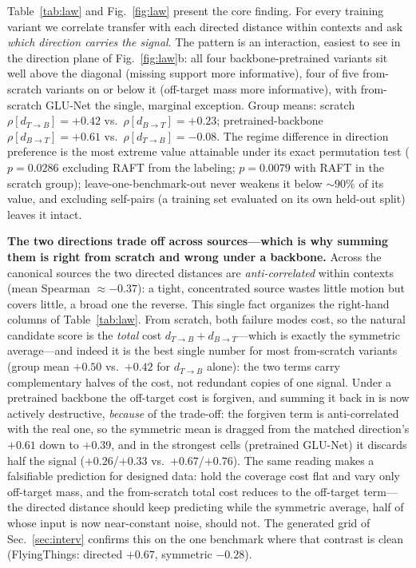 \documentclass[runningheads]{llncs}
\newcommand{\dtb}{d_{T\to B}}
\newcommand{\dbt}{d_{B\to T}}
\begin{document}
\begin{table}[t]
\centering
\caption{\textbf{The identical analysis in appearance (DINO) space} (the
negative control for Table~\ref{tab:law}): no direction and no symmetric
distance carries usable signal for any variant, and no regime structure
exists. Whatever drives Table~\ref{tab:law} lives in motion, not in what the
frames look like.}
\label{tab:lawdino}
\footnotesize

\end{table}

Table~\ref{tab:law} and Fig.~\ref{fig:law} present the core finding. For
every training variant we correlate transfer with each directed distance
within contexts and ask \emph{which direction carries the signal}. The
pattern is an interaction, easiest to see in the direction plane of
Fig.~\ref{fig:law}b: all four backbone-pretrained variants sit well above
the diagonal (missing support more informative), four of five from-scratch
variants on or below it (off-target mass more informative), with from-scratch
GLU-Net the single, marginal exception. Group means: scratch
$\rho[\dtb]{=}{+}0.42$ vs.\ $\rho[\dbt]{=}{+}0.23$; pretrained-backbone
$\rho[\dbt]{=}{+}0.61$ vs.\ $\rho[\dtb]{=}{-}0.08$. The regime difference in
direction preference is the most extreme value attainable under its exact
permutation test ($p{=}0.0286$ excluding RAFT from the labeling; $p{=}0.0079$
with RAFT in the scratch group); leave-one-benchmark-out never weakens it
below ${\sim}90\%$ of its value, and excluding self-pairs (a training set evaluated
on its own held-out split) leaves it intact.

\noindent\textbf{The two directions trade off across sources---which is why
summing them is right from scratch and wrong under a backbone.}
Across the canonical sources the two directed distances are
\emph{anti-correlated} within contexts (mean Spearman $\approx{-}0.37$): a
tight, concentrated source wastes little motion but covers little, a broad
one the reverse. This single fact organizes the right-hand columns of
Table~\ref{tab:law}. From scratch, both failure modes cost, so the natural
candidate score is the \emph{total} cost $\dtb{+}\dbt$---which is exactly the
symmetric average---and indeed it is the best single number for most
from-scratch variants (group mean $+0.50$ vs.\ $+0.42$ for $\dtb$ alone):
the two terms carry complementary halves of the cost, not redundant copies
of one signal. Under a pretrained backbone the off-target cost is forgiven,
and summing it back in is now actively destructive, \emph{because} of the
trade-off: the forgiven term is anti-correlated with the real one, so the
symmetric mean is dragged from the matched direction's $+0.61$ down to
$+0.39$, and in the strongest cells (pretrained GLU-Net) it discards half
the signal ($+0.26$/$+0.33$ vs.\ $+0.67$/$+0.76$). The same reading makes a
falsifiable prediction for designed data: hold the coverage cost flat and
vary only off-target mass, and the from-scratch total cost reduces to the
off-target term---the directed distance should keep predicting while the
symmetric average, half of whose input is now near-constant noise, should
not. The generated grid of Sec.~\ref{sec:interv} confirms this on the one
benchmark where that contrast is clean (FlyingThings: directed $+0.67$,
symmetric $-0.28$).
\end{document}
